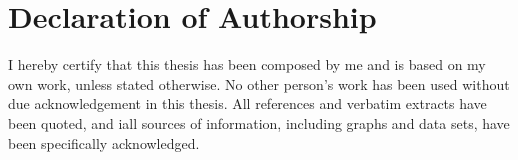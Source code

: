 \documentclass[
	10pt, %
	twoside, %
	chapterinoneline,%
	onehalfspacing, %
	nolistspacing, %
	parskip, %
	headsepline, %
	english,
]{MastersDoctoralThesis} %
\begin{document}




	\chapter*{Declaration of Authorship}
		I hereby certify that this thesis has been composed by me and is based on 
		my own work, unless stated otherwise.	No other person’s work has been used
		without due acknowledgement in this thesis.
		All references and verbatim extracts have been quoted, and iall sources of
		information, including graphs and data sets, have been specifically
		acknowledged.\\[2.0cm]
\end{document}
